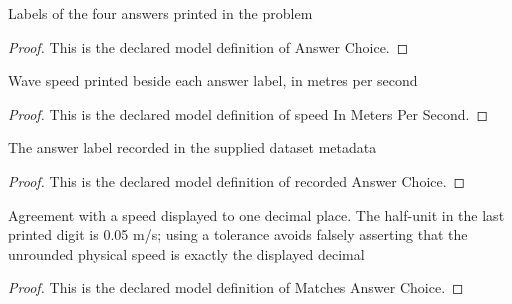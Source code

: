 \begin{definition}
  \label{def:physics:phyx-mini-0241:phyxminiproblems-problemphyxmini0241-answerchoice}
  Labels of the four answers printed in the problem
\end{definition}
\begin{proof}
  This is the declared model definition of Answer Choice.
\end{proof}
\begin{definition}
  \label{def:physics:phyx-mini-0241:phyxminiproblems-problemphyxmini0241-answerchoice-speedinmeterspersecond}
  Wave speed printed beside each answer label, in metres per second
\end{definition}
\begin{proof}
  This is the declared model definition of speed In Meters Per Second.
\end{proof}
\begin{definition}
  \label{def:physics:phyx-mini-0241:phyxminiproblems-problemphyxmini0241-recordedanswerchoice}
  The answer label recorded in the supplied dataset metadata
\end{definition}
\begin{proof}
  This is the declared model definition of recorded Answer Choice.
\end{proof}
\begin{definition}
  \label{def:physics:phyx-mini-0241:phyxminiproblems-problemphyxmini0241-matchesanswerchoice}
  Agreement with a speed displayed to one decimal place. The half-unit in the last printed digit is 0.05 m/s; using a tolerance avoids falsely asserting that the unrounded physical speed is exactly the displayed decimal
\end{definition}
\begin{proof}
  This is the declared model definition of Matches Answer Choice.
\end{proof}
